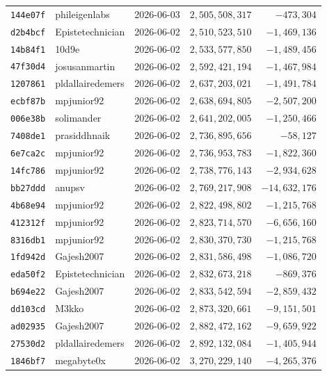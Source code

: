 {\begin{longtable}{@{}lllrr@{}}
\texttt{144e07f} & phileigenlabs & 2026-06-03 & $2{,}505{,}508{,}317$ & $-473{,}304$\\
\texttt{d2b4bcf} & Epistetechnician & 2026-06-02 & $2{,}510{,}523{,}510$ & $-1{,}469{,}136$\\
\texttt{14b84f1} & 10d9e & 2026-06-02 & $2{,}533{,}577{,}850$ & $-1{,}489{,}456$\\
\texttt{47f30d4} & josusanmartin & 2026-06-02 & $2{,}592{,}421{,}194$ & $-1{,}467{,}984$\\
\texttt{1207861} & pldallairedemers & 2026-06-02 & $2{,}637{,}203{,}021$ & $-1{,}491{,}784$\\
\texttt{ecbf87b} & mpjunior92 & 2026-06-02 & $2{,}638{,}694{,}805$ & $-2{,}507{,}200$\\
\texttt{006e38b} & solimander & 2026-06-02 & $2{,}641{,}202{,}005$ & $-1{,}250{,}466$\\
\texttt{7408de1} & prasiddhnaik & 2026-06-02 & $2{,}736{,}895{,}656$ & $-58{,}127$\\
\texttt{6e7ca2c} & mpjunior92 & 2026-06-02 & $2{,}736{,}953{,}783$ & $-1{,}822{,}360$\\
\texttt{14fc786} & mpjunior92 & 2026-06-02 & $2{,}738{,}776{,}143$ & $-2{,}934{,}628$\\
\texttt{bb27ddd} & anupsv & 2026-06-02 & $2{,}769{,}217{,}908$ & $-14{,}632{,}176$\\
\texttt{4b68e94} & mpjunior92 & 2026-06-02 & $2{,}822{,}498{,}802$ & $-1{,}215{,}768$\\
\texttt{412312f} & mpjunior92 & 2026-06-02 & $2{,}823{,}714{,}570$ & $-6{,}656{,}160$\\
\texttt{8316db1} & mpjunior92 & 2026-06-02 & $2{,}830{,}370{,}730$ & $-1{,}215{,}768$\\
\texttt{1fd942d} & Gajesh2007 & 2026-06-02 & $2{,}831{,}586{,}498$ & $-1{,}086{,}720$\\
\texttt{eda50f2} & Epistetechnician & 2026-06-02 & $2{,}832{,}673{,}218$ & $-869{,}376$\\
\texttt{b694e22} & Gajesh2007 & 2026-06-02 & $2{,}833{,}542{,}594$ & $-2{,}859{,}432$\\
\texttt{dd103cd} & M3kko & 2026-06-02 & $2{,}873{,}320{,}661$ & $-9{,}151{,}501$\\
\texttt{ad02935} & Gajesh2007 & 2026-06-02 & $2{,}882{,}472{,}162$ & $-9{,}659{,}922$\\
\texttt{27530d2} & pldallairedemers & 2026-06-02 & $2{,}892{,}132{,}084$ & $-1{,}405{,}944$\\
\texttt{1846bf7} & megabyte0x & 2026-06-02 & $3{,}270{,}229{,}140$ & $-4{,}265{,}376$\\

\end{longtable}}
